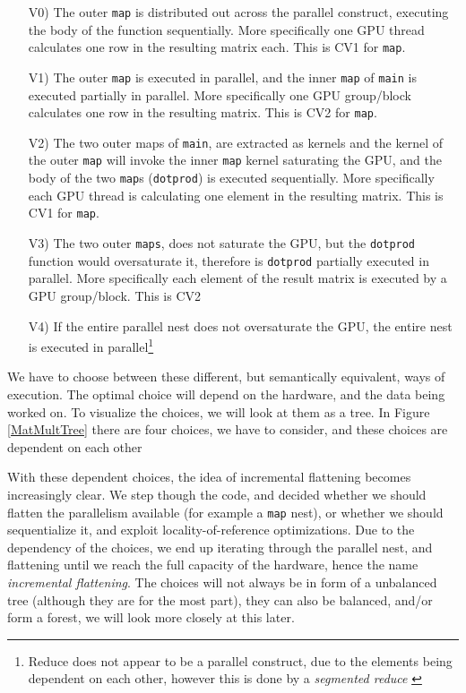 \begin{itemize}
	\item[V0)] The outer \texttt{map} is distributed out across the parallel construct, executing the body of the function sequentially. More specifically one GPU thread calculates one row in the resulting matrix each. This is CV1 for \texttt{map}.
	\item[V1)] The outer \texttt{map} is executed in parallel, and the inner \texttt{map} of \texttt{main} is executed partially in parallel. More specifically one GPU group/block calculates one row in the resulting matrix. This is CV2 for \texttt{map}. 
	\item[V2)] The two outer maps of \texttt{main}, are extracted as kernels and the kernel of the outer \texttt{map} will invoke the inner \texttt{map} kernel saturating the GPU, and the body of the two \texttt{map}s (\texttt{dotprod}) is executed sequentially. More specifically each GPU thread is calculating one element in the resulting matrix. This is CV1 for \texttt{map}.
	\item[V3)] The two outer \texttt{maps}, does not saturate the GPU, but the \texttt{dotprod} function would oversaturate it, therefore is \texttt{dotprod} partially executed in parallel. More specifically each element of the result matrix is executed by a GPU group/block. This is CV2
	\item[V4)] If the entire parallel nest does not oversaturate the GPU, the entire nest is executed in parallel\footnote{Reduce does not appear to be a parallel construct, due to the elements being dependent on each other, however this is done by a \textit{segmented reduce} \cite{segred}}
\end{itemize} 
We have to choose between these different, but semantically equivalent, ways of execution. The optimal choice will depend on the hardware, and the data being worked on. To visualize the choices, we will look at them as a tree. In Figure \ref{MatMultTree} there are four choices, we have to consider, and these choices are dependent on each other
\begin{center}
	\centering 
	
	\label{MatMultTree}
\end{center}
With these dependent choices, the idea of incremental flattening becomes increasingly clear. We step though the code, and decided whether we should flatten the parallelism available (for example a \texttt{map} nest), or whether we should sequentialize it, and exploit locality-of-reference optimizations. Due to the dependency of the choices, we end up iterating through the parallel nest, and flattening until we reach the full capacity of the hardware, hence the name \textit{incremental flattening}. The choices will not always be in form of a unbalanced tree (although they are for the most part), they can also be balanced, and/or form a forest, we will look more closely at this later.

